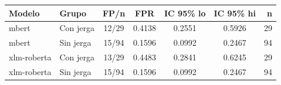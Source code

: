 \begin{tabular}{llccccr}
\toprule
Modelo & Grupo & FP/n & FPR & IC 95\% lo & IC 95\% hi & n \\
\midrule
mbert & Con jerga & 12/29 & 0.4138 & 0.2551 & 0.5926 & 29 \\
mbert & Sin jerga & 15/94 & 0.1596 & 0.0992 & 0.2467 & 94 \\
xlm-roberta & Con jerga & 13/29 & 0.4483 & 0.2841 & 0.6245 & 29 \\
xlm-roberta & Sin jerga & 15/94 & 0.1596 & 0.0992 & 0.2467 & 94 \\
\bottomrule
\end{tabular}
